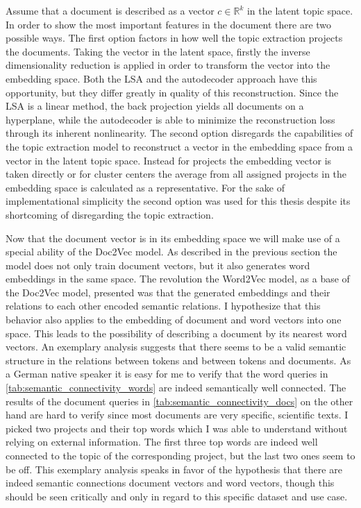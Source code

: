 Assume that a document is described as a vector $c \in \mathbb{R}^k$ in the latent topic space. In order to show the most important features in the document there are two possible ways. The first option factors in how well the topic extraction projects the documents. Taking the vector in the latent space, firstly the inverse dimensionality reduction is applied in order to transform the vector into the embedding space. Both the LSA and the autodecoder approach have this opportunity, but they differ greatly in quality of this reconstruction. Since the LSA is a linear method, the back projection yields all documents on a hyperplane, while the autodecoder is able to minimize the reconstruction loss through its inherent nonlinearity. 
The second option disregards the capabilities of the topic extraction model to reconstruct a vector in the embedding space from a vector in the latent topic space. Instead for projects the embedding vector is taken directly or for cluster centers the average from all assigned projects in the embedding space is calculated as a representative. For the sake of implementational simplicity the second option was used for this thesis despite its shortcoming of disregarding the topic extraction.

Now that the document vector is in its embedding space we will make use of a special ability of the Doc2Vec model. As described in the previous section the model does not only train document vectors, but it also generates word embeddings in the same space. The revolution the Word2Vec model, as a base of the Doc2Vec model, presented was that the generated embeddings and their relations to each other encoded semantic relations. I hypothesize that this behavior also applies to the embedding of document and word vectors into one space. This leads to the possibility of describing a document by its nearest word vectors. An exemplary analysis suggests that there seems to be a valid semantic structure in the relations between tokens and between tokens and documents. As a German native speaker it is easy for me to verify that the word queries in \autoref{tab:semantic_connectivity_words} are indeed semantically well connected. The results of the document queries in \autoref{tab:semantic_connectivity_docs} on the other hand are hard to verify since most documents are very specific, scientific texts. I picked two projects and their top words which I was able to understand without relying on external information. The first three top words are indeed well connected to the topic of the corresponding project, but the last two ones seem to be off. This exemplary analysis speaks in favor of the hypothesis that there are indeed semantic connections document vectors and word vectors, though this should be seen critically and only in regard to this specific dataset and use case.

